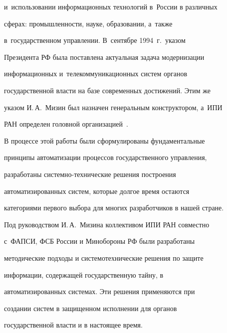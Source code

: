 и~использовании информационных технологий в~России в различных 

сферах: промышленности, науке, об\-разовании, а~также 

в~государственном управ\-лении. В~сентябре 1994~г.\ указом 

Президента РФ была поставлена актуальная задача модернизации 

информационных и~телекоммуникационных систем органов 

государственной власти на базе современных достижений. Этим же 

указом И.\,А.~Мизин был назначен генеральным конструктором, а~ИПИ 

РАН определен головной организацией~\cite{10-sok, 13-sok}.

 

  

 В процессе этой работы были сформулированы фундаментальные 

принципы автоматизации процессов государственного управ\-ления, 

разработаны сис\-тем\-но-тех\-ни\-че\-ские решения построения 

автоматизированных сис\-тем, которые долгое время остаются 

категориями первого выбора для многих разработчиков в нашей стране.

 

 Под руководством И.\,А.~Мизина коллективом ИПИ РАН совместно 

с~\mbox{ФАПСИ}, ФСБ России и Минобороны РФ были разработаны 

методические подходы и системотехнические решения по защите 

информации, содержащей государственную тайну, в 

автоматизированных системах. Эти решения применяются при 

создании систем в защищенном исполнении для органов 

государственной власти и в настоящее время.



